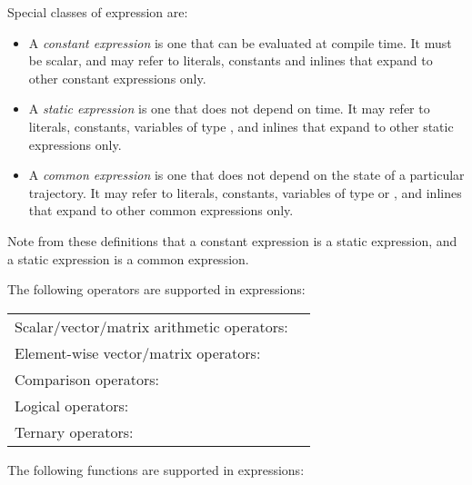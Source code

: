 Special classes of expression are:
\begin{itemize}
\item A \textit{constant expression} is one that
  can be evaluated at compile time. It must be scalar, and may refer to
  literals, constants and inlines that expand to other constant expressions
  only.
\item A \textit{static expression} is one that does
  not depend on time. It may refer to literals, constants, variables of type
  , and inlines that expand to other static expressions only.
\item A \textit{common expression} is one that does
  not depend on the state of a particular trajectory. It may refer to
  literals, constants, variables of type  or , and
  inlines that expand to other common expressions only.
\end{itemize}
Note from these definitions that a constant expression is a static expression,
and a static expression is a common expression.


The following operators are supported in expressions:

\noindent
\begin{tabular}{lr}
\hline
Scalar/vector/matrix arithmetic operators: & \bitt{+ - * / \% **} \\
Element-wise vector/matrix operators:  & \bitt{.+ .- .* ./ .\% .**} \\
Comparison operators: & \bitt{== != < <= > >= } \\
Logical operators: & \bitt{\&\& ||} \\
Ternary operators: & \bitt{?:} \\
\hline
\end{tabular}


The following functions are supported in expressions:

